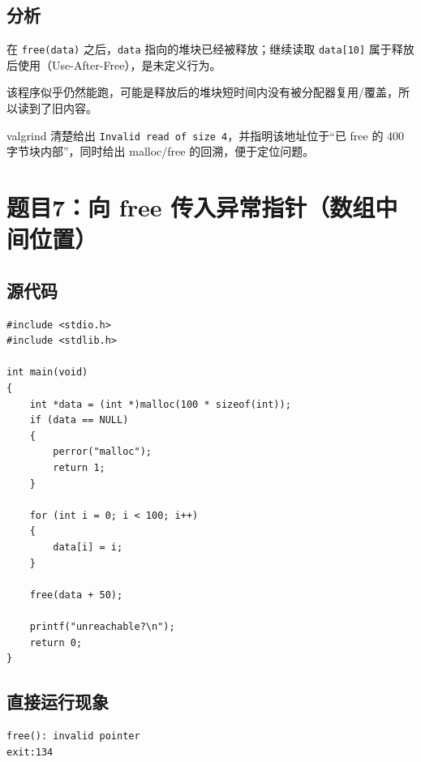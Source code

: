 \documentclass[fleqn]{ctexart}
\begin{document}
\subsection*{分析}
在 \verb|free(data)| 之后，\verb|data| 指向的堆块已经被释放；继续读取 \verb|data[10]| 属于释放后使用（Use-After-Free），是未定义行为。

该程序似乎仍然能跑，可能是释放后的堆块短时间内没有被分配器复用/覆盖，所以读到了旧内容。

valgrind 清楚给出 \verb|Invalid read of size 4|，并指明该地址位于“已 free 的 400 字节块内部”，同时给出 malloc/free 的回溯，便于定位问题。


\section*{题目7：向 free 传入异常指针（数组中间位置）}
\subsection*{源代码}
\begin{verbatim}
#include <stdio.h>
#include <stdlib.h>

int main(void)
{
	int *data = (int *)malloc(100 * sizeof(int));
	if (data == NULL)
	{
		perror("malloc");
		return 1;
	}

	for (int i = 0; i < 100; i++)
	{
		data[i] = i;
	}

	free(data + 50);

	printf("unreachable?\n");
	return 0;
}
\end{verbatim}

\subsection*{直接运行现象}
\begin{verbatim}
free(): invalid pointer
exit:134
\end{verbatim}
\end{document}
